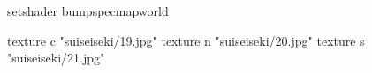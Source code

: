 setshader bumpspecmapworld

    texture c "suiseiseki/19.jpg"
    texture n "suiseiseki/20.jpg"
    texture s "suiseiseki/21.jpg"
